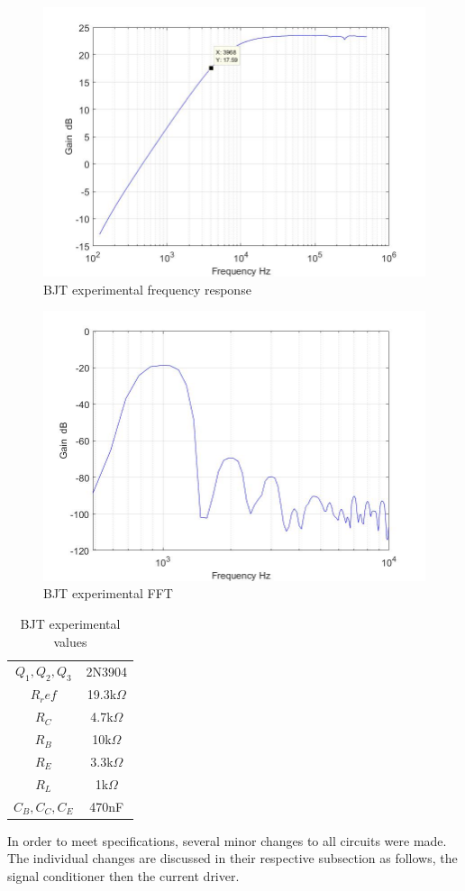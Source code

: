 \begin{figure}[H]
	\centering
	\includegraphics[width=0.7\linewidth]{ExperimentalImplementation/bjt_outputexp.jpg}
	\caption{BJT experimental frequency response}
	\label{fig:bjtexpfreq}
\end{figure}


\begin{figure}[H]
	\centering
	\includegraphics[width=0.7\linewidth]{ExperimentalImplementation/bjt_fft.jpg}
	\caption{BJT experimental FFT}
	\label{fig:bjtexpfft}
\end{figure}




\begin{table}[H]
	\centering
	\caption{BJT experimental values}
	\label{tab:bjtexp}
	\begin{tabular}{cc}
		$Q_1, Q_2, Q_3$ & 2N3904        \\
		$R_ref$         & 19.3k$\Omega$ \\
		$R_C$           & 4.7k$\Omega$  \\
		$R_B$           & 10k$\Omega$   \\
		$R_E$           & 3.3k$\Omega$  \\
		$R_L$           & 1k$\Omega$    \\
		$C_B, C_C, C_E$ & 470nF        
	\end{tabular}
\end{table}

In order to meet specifications, several minor changes to all circuits were made. The individual changes are discussed in their respective subsection as follows, the signal conditioner then the current driver.


%




